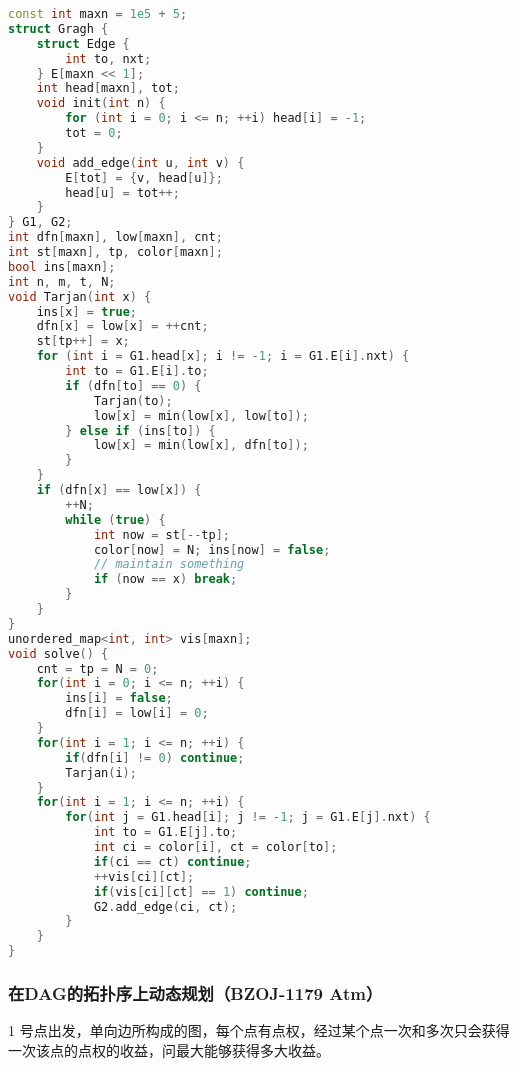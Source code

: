 \begin{lstlisting}[language=C++]
const int maxn = 1e5 + 5;
struct Gragh {
    struct Edge {
        int to, nxt;
    } E[maxn << 1];
    int head[maxn], tot;
    void init(int n) {
        for (int i = 0; i <= n; ++i) head[i] = -1;
        tot = 0;
    }
    void add_edge(int u, int v) {
        E[tot] = {v, head[u]};
        head[u] = tot++;
    }
} G1, G2;
int dfn[maxn], low[maxn], cnt;
int st[maxn], tp, color[maxn];
bool ins[maxn];
int n, m, t, N;
void Tarjan(int x) {
    ins[x] = true;
    dfn[x] = low[x] = ++cnt;
    st[tp++] = x;
    for (int i = G1.head[x]; i != -1; i = G1.E[i].nxt) {
        int to = G1.E[i].to;
        if (dfn[to] == 0) {
            Tarjan(to);
            low[x] = min(low[x], low[to]);
        } else if (ins[to]) {
            low[x] = min(low[x], dfn[to]);
        }
    }
    if (dfn[x] == low[x]) {
        ++N;
        while (true) {
            int now = st[--tp];
            color[now] = N; ins[now] = false;
            // maintain something
            if (now == x) break;
        }
    }
}
unordered_map<int, int> vis[maxn];
void solve() {
    cnt = tp = N = 0;
    for(int i = 0; i <= n; ++i) {
        ins[i] = false;
        dfn[i] = low[i] = 0;
    }
    for(int i = 1; i <= n; ++i) {
        if(dfn[i] != 0) continue;
        Tarjan(i);
    }
    for(int i = 1; i <= n; ++i) {
        for(int j = G1.head[i]; j != -1; j = G1.E[j].nxt) {
            int to = G1.E[j].to;
            int ci = color[i], ct = color[to];
            if(ci == ct) continue;
            ++vis[ci][ct];
            if(vis[ci][ct] == 1) continue;
            G2.add_edge(ci, ct);
        }
    }
}
\end{lstlisting}

\subsubsection{在DAG的拓扑序上动态规划（BZOJ-1179 Atm）}

1 号点出发，单向边所构成的图，每个点有点权，经过某个点一次和多次只会获得一次该点的点权的收益，问最大能够获得多大收益。


